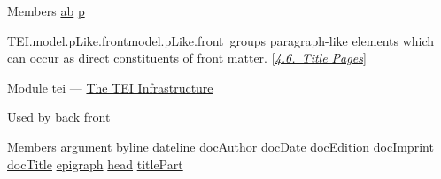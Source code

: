 \begin{reflist}
    \item[{Members}]
  \hyperref[TEI.ab]{ab} \hyperref[TEI.p]{p}
\end{reflist}  
\begin{reflist}
\item[]\begin{specHead}{TEI.model.pLike.front}{model.pLike.front} groups paragraph-like elements which can occur as direct constituents of front matter. [\textit{\hyperref[DSTITL]{4.6.\ Title Pages}}]\end{specHead} 
    \item[{Module}]
  tei — \hyperref[ST]{The TEI Infrastructure}
    \item[{Used by}]
  \hyperref[TEI.back]{back} \hyperref[TEI.front]{front}
    \item[{Members}]
  \hyperref[TEI.argument]{argument} \hyperref[TEI.byline]{byline} \hyperref[TEI.dateline]{dateline} \hyperref[TEI.docAuthor]{docAuthor} \hyperref[TEI.docDate]{docDate} \hyperref[TEI.docEdition]{docEdition} \hyperref[TEI.docImprint]{docImprint} \hyperref[TEI.docTitle]{docTitle} \hyperref[TEI.epigraph]{epigraph} \hyperref[TEI.head]{head} \hyperref[TEI.titlePart]{titlePart}
\end{reflist}  

